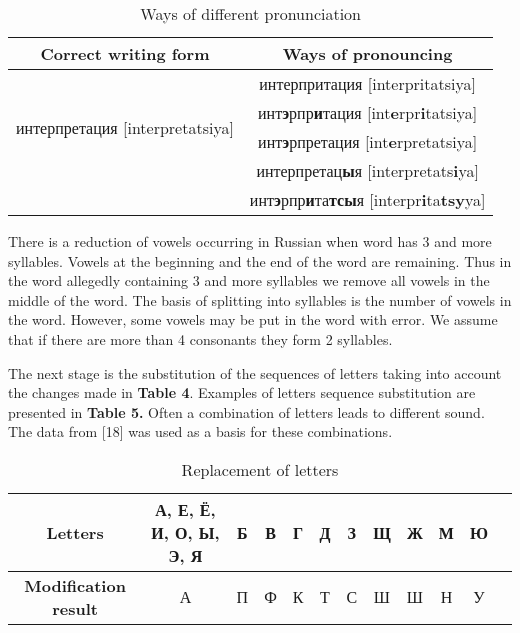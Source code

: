 \documentclass[conference,a4paper]{IEEEtran}
\begin{document}
\begin{table}[t!]
\renewcommand{\arraystretch}{1.3}
\caption{Ways of different pronunciation}
\label{lbl-simphon}
\centering
\begin{tabular}{|c|c|}
\hline
Correct writing form & Ways of pronouncing\\
\hline
\multirow{4}{*}{интерпретация [interpretatsiya]} & интерпритация [interpritatsiya] \\
\cline{2-2}
	& инт\textbf{э}рпр\textbf{и}тация [int\textbf{e}rpr\textbf{i}tatsiya] \\ 
\cline{2-2}
	& инт\textbf{э}рпретация [int\textbf{e}rpretatsiya] \\
\cline{2-2}
	& интерпретац\textbf{ы}я [interpretats\textbf{i}ya] \\    
\cline{2-2}
	& инт\textbf{э}рпр\textbf{и}та\textbf{тсы}я [interpr\textbf{i}ta\textbf{tsy}ya] \\        
\hline
\end{tabular}
\end{table}

There is a reduction of vowels occurring in Russian when word has 3 and more syllables. Vowels at the beginning and the end of the word are remaining. Thus in the word allegedly containing 3 and more syllables we remove all vowels in the middle of the word. The basis of splitting into syllables is the number of vowels in the word. However, some vowels may be put in the word with error. We assume that if there are more than 4 consonants they form 2 syllables.

The next stage is the substitution of the sequences of letters taking into account the changes made in \textbf{Table 4}. Examples of letters sequence substitution are presented in \textbf{Table 5.} Often a combination of letters leads to different sound. The data from  [18] was used as a basis for these combinations.

\begin{table*}[t!]
 \caption{Replacement of letters}
 \label{lbl-raplacement}
 \centering
 \begin{tabular}{|c*{11}{|c}|}
 \hline
 \textbf{Letters} &	А, Е, Ё, И, О, Ы, Э, Я	& Б & В & Г &	Д &	З &	Щ &	Ж &	М &	Ю \\
 \hline
 \textbf{Modification result} &	А &	П &	Ф &	К &	Т &	С &	Ш &	Ш &	Н &	У \\
\hline
 \end{tabular}
\end{table*}
\end{document}
